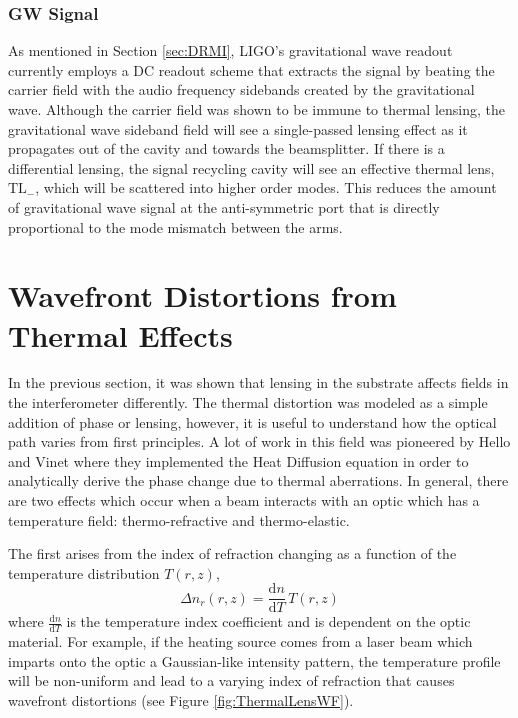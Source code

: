 		\subsubsection{GW Signal}
		As mentioned in Section \ref{sec:DRMI}, LIGO's gravitational wave readout currently employs a DC readout scheme that extracts the signal by beating the carrier field with the audio frequency sidebands created by the gravitational wave.  Although the carrier field was shown to be immune to thermal lensing, the gravitational wave sideband field will see a single-passed lensing effect as it propagates out of the cavity and towards the beamsplitter.  If there is a differential lensing, the signal recycling cavity will see an effective thermal lens, $\text{TL}_{-}$, which will be scattered into higher order modes.  This reduces the amount of gravitational wave signal at the anti-symmetric port that is directly proportional to the mode mismatch between the arms.
	
	\section{Wavefront Distortions from Thermal Effects}\label{sec:wf_dist}
	In the previous section, it was shown that lensing in the substrate affects fields in the interferometer differently.  The thermal distortion was modeled as a simple addition of phase or lensing, however, it is useful to understand how the optical path varies from first principles.  A lot of work in this field was pioneered by Hello and Vinet \cite{hello_vinet} \cite{Vinet_Thermal_Issues} where they implemented the Heat Diffusion equation in order to analytically derive the phase change due to thermal aberrations.  In general, there are two effects which occur when a beam interacts with an optic which has a temperature field: thermo-refractive and thermo-elastic.  
	
	The first arises from the index of refraction changing as a function of the temperature distribution $T(r,z)$,
	\begin{equation}
	\Delta n_{r}(r,z) = \frac{\text{d}n}{\text{d}T} \, T(r,z)
	\end{equation}
	where $\frac{\text{d}n}{\text{d}T}$ is the temperature index coefficient and is dependent on the optic material.  For example, if the heating source comes from a laser beam which imparts onto the optic a Gaussian-like intensity pattern, the temperature profile will be non-uniform and lead to a varying index of refraction that causes wavefront distortions (see Figure \ref{fig:ThermalLensWF}).

